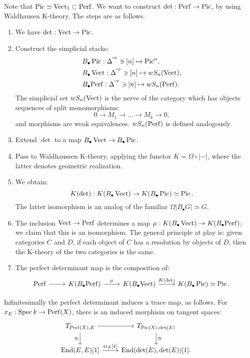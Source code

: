 Note that $\operatorname{Pic} \simeq \operatorname{Vect}_1 \subset \mathrm{Perf}$. We want to construct $\det: \mathrm{Perf} \to \operatorname{Pic}$, by using Waldhausen K-theory.
The steps are as follows.
\begin{enumerate}
\item We have $\det : \operatorname{Vect} \to \operatorname{Pic}$.
\item Construct the simplicial stacks:
\begin{align*}
&B_{\bullet}\operatorname{Pic} : \Delta^{^\mathrm{op}} \ni [n] \mapsto \operatorname{Pic}^n, \\
&B_{\bullet}\operatorname{Vect}: \Delta^{^\mathrm{op}} \ni [n] \mapsto wS_n(\operatorname{Vect}), \\
&B_{\bullet}\mathrm{Perf}: \Delta^{^\mathrm{op}} \ni [n] \mapsto wS_n(\mathrm{Perf}). \\
\end{align*}
The simplicial set $wS_n(\operatorname{Vect})$ is the nerve of the category which has objects sequences of split monomorphisms:
\[		0 \to M_1 \to \dots \to M_k \to 0,	\]
and morphisms are weak equivalences. $wS_n(\mathrm{Perf})$ is defined analogously.
\item Extend $\det$ to a map $B_{\bullet}\operatorname{Vect} \to B_{\bullet}\operatorname{Pic}$.
\item Pass to Waldhaussen K-theory, applying the functor $K = \Omega \circ | - |$, where the latter denotes geometric
realization.
\item We obtain:
\[	K(\det) : K(B_{\bullet}\operatorname{Vect}) \to K(B_{\bullet}\operatorname{Pic}) \simeq \operatorname{Pic}.	\]
The latter isomorphism is an analog of the familiar $\Omega|B_{\bullet}G|\simeq G$.
\item The inclusion $\operatorname{Vect} \to \mathrm{Perf}$ determines a map $\mu: K(B_{\bullet}\operatorname{Vect}) \to K(B_{\bullet}\mathrm{Perf})$; we claim that this
is an isomorphism. The general principle at play is: given categories $C$ and $D$, if each object of $C$ has a resolution by objects
of $D$, then the K-theory of the two categories is the same.
\item The perfect determinant map is the composition of:
\[
\begin{tikzcd}
\Perf\arrow{r} & K(B_{\bullet}\Perf) \arrow{r}{\mu} & K(B_{\bullet}{\Vect}) \arrow{r}{K(\det)} & K(B_{\bullet}\Pic)\simeq \Pic.
\end{tikzcd}
\]
\end{enumerate}

Infinitesimally the perfect determinant induces a trace map, as follows. For $x_E : \operatorname{Spec} k \to \mathrm{Perf}(X)$, there is
an induced morphism on tangent spaces:
\[
\begin{tikzcd}
T_{\Perf(X),E} \arrow{r}\arrow[swap]{d}{\cong} & T_{\Pic(X), \det(E)}\arrow{d}{\cong} \\
\End(E,E)[1]\arrow{r}{\tr_E[1]} & \End(\det(E),\det(E))[1] .
\end{tikzcd}
\]

